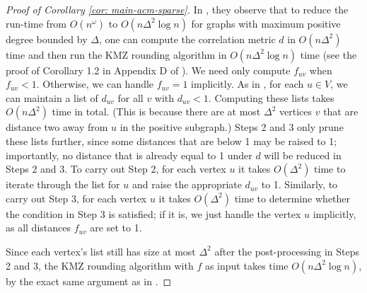 \begin{proof}[Proof of Corollary \ref{cor: main-acm-sparse}]
    In \cite{DMN23}, they observe that to reduce the run-time from $O(n^\omega)$ to $O(n\Delta^2 \log n)$ for graphs with maximum positive degree bounded by $\Delta$, one can compute the correlation metric $d$ in $O(n\Delta^2)$ time and then run the KMZ rounding algorithm in $O(n\Delta^2 \log n)$ time (see the proof of Corollary 1.2 in Appendix D of \cite{DMN23}). We need only compute $f_{uv}$ when $f_{uv}<1$. Otherwise, we can handle $f_{uv} = 1$ implicitly. As in \cite{DMN23}, for each $u \in V$, we can maintain a list of  $d_{uv}$ for all $v$ with $d_{uv} < 1$. Computing these lists takes $O(n\Delta^2)$ time in total. (This is because there are at most $\Delta^2$ vertices $v$ that are distance two away from $u$ in the positive subgraph.) Steps 2 and 3 only prune these lists further, since some distances that are below 1 may be raised to 1; importantly, no distance that is already equal to 1 under $d$ will be reduced in Steps 2 and 3. To carry out Step 2, for each vertex $u$ it takes $O(\Delta^2)$ time to iterate through the list for $u$ and raise the appropriate $d_{uv}$ to 1. Similarly, to carry out Step 3, for each vertex $u$ it takes $O(\Delta^2)$ time to determine whether the condition in Step 3 is satisfied; if it is, we just handle the vertex $u$ implicitly, as all distances $f_{uv}$ are set to 1. 

    Since each vertex's list still has size at most $\Delta^2$ after the post-processing in Steps 2 and 3, the KMZ rounding algorithm with $f$ as input takes time $O(n\Delta^2 \log n)$, by the exact same argument as in \cite{DMN23}.  
\end{proof}










